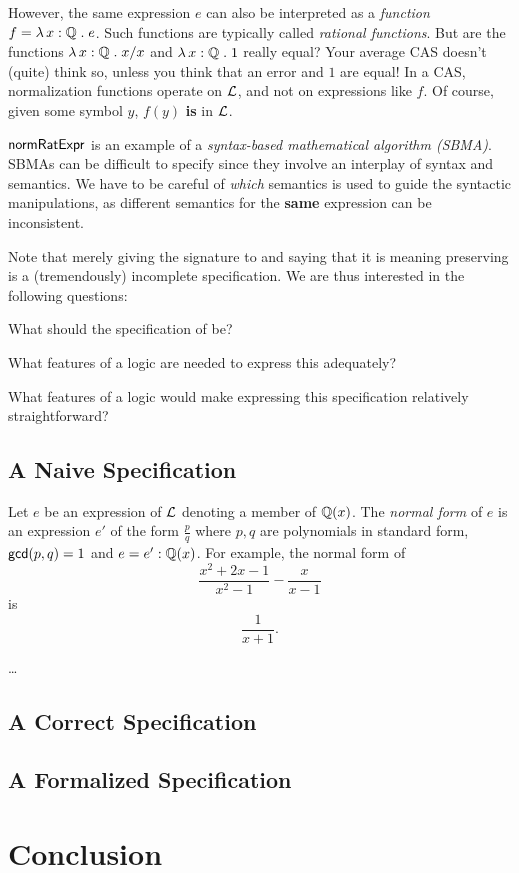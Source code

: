 \documentclass[fleqn]{llncs}
\begin{document}
However, the same expression $e$ can also be interpreted as a 
\emph{function} $f = \lambda\, x : \mathbb{Q} \mathrel. e$. Such functions
are typically called \emph{rational functions}. But are the functions
$\lambda\, x : \mathbb{Q} \mathrel. x/x$ and $\lambda\, x : \mathbb{Q} \mathrel.1$ really equal? Your average CAS doesn't
(quite) think so, unless you think that an error and $1$ are equal!
In a CAS, normalization functions operate on $\mathcal{L}$, and not on
expressions like $f$.  Of course, given some symbol $y$, $f(y)$
\textbf{is} in $\mathcal{L}$.

$\mbox{\sf normRatExpr}$ is an example of 
a \emph{syntax-based mathematical algorithm (SBMA)}.
SBMAs can be difficult to specify since they involve an interplay of
syntax and semantics.  We have to be careful of \emph{which} semantics
is used to guide the syntactic manipulations, as different semantics
for the \textbf{same} expression can be inconsistent.

Note that merely giving the signature to \NRE and saying that it is
meaning preserving is a (tremendously) incomplete specification.
We are thus interested in the following questions:

\be

  \item What should the specification of \NRE be?

  \item What features of a logic are needed to express this adequately?

  \item What features of a logic would make expressing this
    specification relatively straightforward?

\ee

\subsection{A Naive Specification}

Let $e$ be an expression of $\mathcal{L}$ denoting a member of $\mathbb{Q}(x)$.
The \emph{normal form} of $e$ is an expression $e'$ of the form
$\frac{p}{q}$ where $p, q$ are polynomials in
standard form, $\mbox{\sf gcd}(p,q)=1$ and $e = e' : \mathbb{Q}(x)$.
For example,
the normal form of \[\frac{x^2 + 2x - 1}{x^2 - 1} - \frac{x}{x - 1}\]
is \[\frac{1}{x + 1}.\]

\ldots

\subsection{A Correct Specification}

\subsection{A Formalized Specification}

\section{Conclusion}




\setcounter{tocdepth}{1}
\listoftodos
\setcounter{tocdepth}{0}
\end{document}
